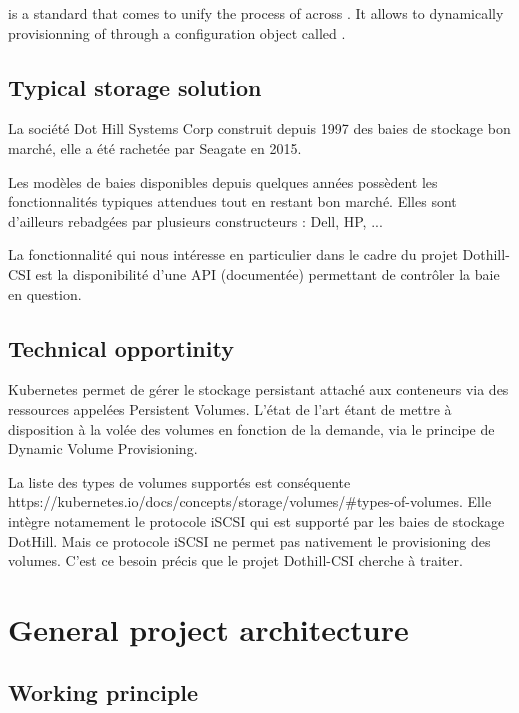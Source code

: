  is a standard that comes to unify the process of  across . It allows to dynamically provisionning of  through a configuration object called .

\subsection{Typical storage solution}

\color{darkgreen}
La société Dot Hill Systems Corp construit depuis 1997 des baies de stockage bon marché, elle a été rachetée par Seagate en 2015.

Les modèles de baies disponibles depuis quelques années possèdent les fonctionnalités typiques attendues tout en restant bon marché. Elles sont d'ailleurs rebadgées par plusieurs constructeurs : Dell, HP, ...

La fonctionnalité qui nous intéresse en particulier dans le cadre du projet Dothill-CSI est la disponibilité d'une API (documentée) permettant de contrôler la baie en question.
\color{black}

\subsection{Technical opportinity}

\color{darkgreen}
Kubernetes permet de gérer le stockage persistant attaché aux conteneurs via des ressources appelées Persistent Volumes. L'état de l'art étant de mettre à disposition à la volée des volumes en fonction de la demande, via le principe de Dynamic Volume Provisioning.

La liste des types de volumes supportés est conséquente https://kubernetes.io/docs/concepts/storage/volumes/\#types-of-volumes. Elle intègre notamement le protocole iSCSI qui est supporté par les baies de stockage DotHill. Mais ce protocole iSCSI ne permet pas nativement le provisioning des volumes. C'est ce besoin précis que le projet Dothill-CSI cherche à traiter.
\color{black}

\section{General project architecture}

\subsection{Working principle}

